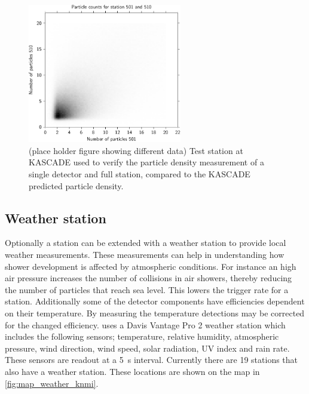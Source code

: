 \begin{figure}
    \centering
    \includegraphics[width=0.6\textwidth]
                    {plots/station/n_501_510_sum}
    \caption{(place holder figure showing different data) Test station at KASCADE used to verify the particle density measurement of a single detector and full station, compared to the KASCADE predicted particle density.}
    \label{fig:n_501_510_sum}
\end{figure}


\subsection{Weather station}

Optionally a \hisparc station can be extended with a weather station to provide local weather measurements. These measurements can help in understanding how shower development is affected by atmospheric conditions. For instance an high air pressure increases the number of collisions in air showers, thereby reducing the number of particles that reach sea level. This lowers the trigger rate for a station. Additionally some of the detector components have efficiencies dependent on their temperature. By measuring the temperature detections may be corrected for the changed efficiency. \hisparc uses a Davis Vantage Pro 2 weather station \cite{davis2012vantagepro} which includes the following sensors; temperature, relative humidity, atmospheric pressure, wind direction, wind speed, solar radiation, UV index and rain rate. These sensors are readout at a \SI{5}{\second} interval. Currently there are 19 \hisparc stations that also have a weather station. These locations are shown on the map in \cref{fig:map_weather_knmi}.

